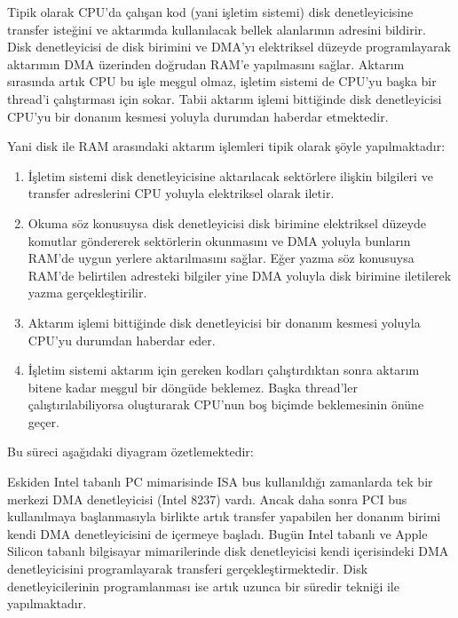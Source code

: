 \documentclass[a4paper,10pt,turkish]{sphinxmanual}
\begin{document}
\sphinxAtStartPar
Tipik olarak CPU’da çalışan kod (yani işletim sistemi) disk denetleyicisine transfer isteğini
ve aktarımda kullanılacak bellek alanlarının adresini bildirir. Disk denetleyicisi de disk
birimini ve DMA’yı elektriksel düzeyde programlayarak aktarımın DMA üzerinden doğrudan RAM’e
yapılmasını sağlar. Aktarım sırasında artık CPU bu işle meşgul olmaz, işletim sistemi de
CPU’yu başka bir thread’i çalıştırması için  sokar. Tabii
aktarım işlemi bittiğinde disk denetleyicisi CPU’yu bir donanım kesmesi yoluyla durumdan
haberdar etmektedir.

\sphinxAtStartPar
Yani disk ile RAM arasındaki aktarım işlemleri tipik olarak şöyle yapılmaktadır:
\begin{enumerate}
%
\item {} 
\sphinxAtStartPar
İşletim sistemi disk denetleyicisine aktarılacak sektörlere ilişkin bilgileri ve transfer
adreslerini CPU yoluyla elektriksel olarak iletir.

\item {} 
\sphinxAtStartPar
Okuma söz konusuysa disk denetleyicisi disk birimine elektriksel düzeyde komutlar göndererek
sektörlerin okunmasını ve DMA yoluyla bunların RAM’de uygun yerlere aktarılmasını sağlar.
Eğer yazma söz konusuysa RAM’de belirtilen adresteki bilgiler yine DMA yoluyla disk birimine
iletilerek yazma gerçekleştirilir.

\item {} 
\sphinxAtStartPar
Aktarım işlemi bittiğinde disk denetleyicisi bir donanım kesmesi yoluyla CPU’yu durumdan
haberdar eder.

\item {} 
\sphinxAtStartPar
İşletim sistemi aktarım için gereken kodları çalıştırdıktan sonra aktarım bitene kadar meşgul
bir döngüde beklemez. Başka thread’ler çalıştırılabiliyorsa 
oluşturarak CPU’nun boş biçimde beklemesinin önüne geçer.

\end{enumerate}

\sphinxAtStartPar
Bu süreci aşağıdaki diyagram özetlemektedir:


\sphinxAtStartPar
Eskiden Intel tabanlı PC mimarisinde ISA bus kullanıldığı zamanlarda tek bir merkezi DMA
denetleyicisi (Intel 8237) vardı. Ancak daha sonra PCI bus kullanılmaya başlanmasıyla birlikte
artık transfer yapabilen her donanım birimi kendi DMA denetleyicisini de içermeye başladı.
Bugün Intel tabanlı ve Apple Silicon tabanlı bilgisayar mimarilerinde disk denetleyicisi kendi
içerisindeki DMA denetleyicisini programlayarak transferi gerçekleştirmektedir. Disk
denetleyicilerinin programlanması ise artık uzunca bir süredir  tekniği ile yapılmaktadır.
\end{document}
